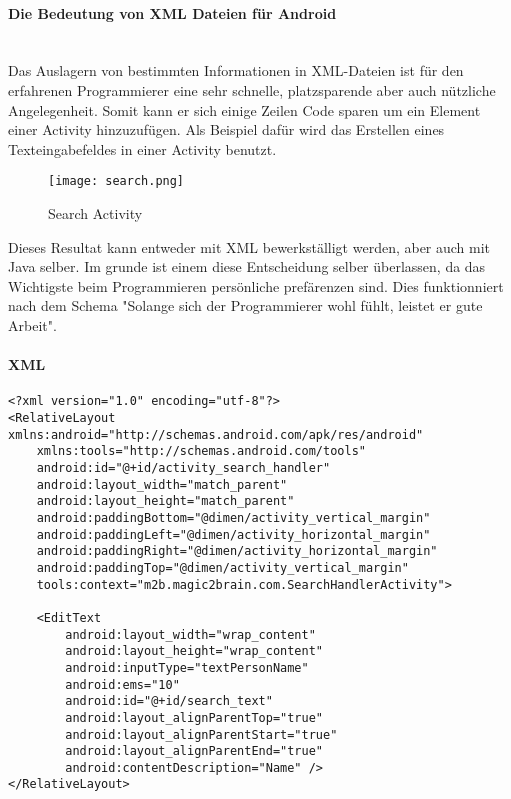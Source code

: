\paragraph{Die Bedeutung von XML Dateien für Android}\\

Das Auslagern von bestimmten Informationen in XML-Dateien ist für den erfahrenen Programmierer eine sehr schnelle, platzsparende aber auch nützliche Angelegenheit.
Somit kann er sich einige Zeilen Code sparen um ein Element einer Activity hinzuzufügen. Als Beispiel dafür wird das Erstellen eines Texteingabefeldes in einer Activity benutzt.

\begin{figure}[htbp] 
  \centering
     \texttt{[image: search.png]}
  \caption{Search Activity \cite{search_app}}
  \label{fig:SearchActivity}
\end{figure}

Dieses Resultat kann entweder mit XML bewerkställigt werden, aber auch mit Java selber. Im grunde ist einem diese Entscheidung selber überlassen, da das Wichtigste beim Programmieren persönliche prefärenzen sind. Dies funktionniert nach dem Schema "Solange sich der Programmierer wohl fühlt, leistet er gute Arbeit".\\

\paragraph{XML}
\begin{lstlisting}
<?xml version="1.0" encoding="utf-8"?>
<RelativeLayout xmlns:android="http://schemas.android.com/apk/res/android"
    xmlns:tools="http://schemas.android.com/tools"
    android:id="@+id/activity_search_handler"
    android:layout_width="match_parent"
    android:layout_height="match_parent"
    android:paddingBottom="@dimen/activity_vertical_margin"
    android:paddingLeft="@dimen/activity_horizontal_margin"
    android:paddingRight="@dimen/activity_horizontal_margin"
    android:paddingTop="@dimen/activity_vertical_margin"
    tools:context="m2b.magic2brain.com.SearchHandlerActivity">

    <EditText
        android:layout_width="wrap_content"
        android:layout_height="wrap_content"
        android:inputType="textPersonName"
        android:ems="10"
        android:id="@+id/search_text"
        android:layout_alignParentTop="true"
        android:layout_alignParentStart="true"
        android:layout_alignParentEnd="true"
        android:contentDescription="Name" />
</RelativeLayout>
\end{lstlisting}

